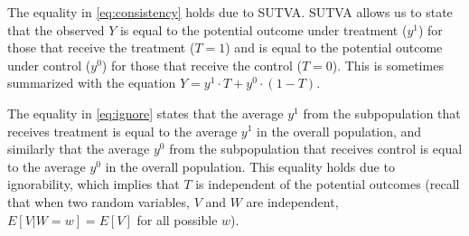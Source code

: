 \documentclass{article}
\begin{document}
The equality in \eqref{eq:consistency} holds due to SUTVA. SUTVA allows us to state that the observed $Y$ is equal to the potential outcome under treatment ($y^1$) for those that receive the treatment ($T=1$) and is equal to the potential outcome under control ($y^0$) for those that receive the control ($T=0$). This is sometimes summarized with the equation $Y =  y^1 \cdot T + y^0 \cdot (1-T)$.
 
The equality in \eqref{eq:ignore} states that the average $y^1$ from the subpopulation that receives treatment is equal to the average $y^1$ in the overall population, and similarly that the average $y^0$ from the subpopulation that receives control is equal to the average $y^0$ in the overall population. This equality holds due to ignorability, which implies that $T$ is independent of the potential outcomes (recall that when two random variables, $V$ and $W$ are independent, $E[V|W=w] = E[V]$ for all possible $w$). 
\end{document}
